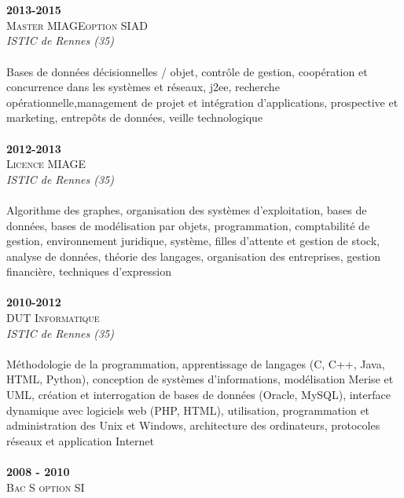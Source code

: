 \begin{titlepage}
\begin{minipage}[t]{8.7cm}
    \\\\
    \textbf{2013-2015} \\
    \textsc{Master MIAGE\footnotemark option SIAD\footnotemark}
    \\\textit{ISTIC de Rennes (35)}
    \\\\Bases de données décisionnelles / objet, contrôle de gestion,
    coopération et concurrence dans les systèmes et réseaux,
    j2ee, recherche opérationnelle,management de
    projet et intégration d'applications, prospective et
    marketing, entrepôts de données, veille technologique
    \\\\\textbf{2012-2013}\\
    \textsc{Licence MIAGE}
    \\\textit{ISTIC de Rennes (35)}
    \\\\Algorithme des graphes, organisation des systèmes d'exploitation,
    bases de données, bases de modélisation par objets, programmation, comptabilité de gestion,
    environnement juridique, système, filles d'attente et
    gestion de stock, analyse de données, théorie des
    langages, organisation des entreprises, gestion financière,
    techniques d'expression
    \\\\\textbf{2010-2012} \\
    \textsc{DUT Informatique}
    \\\textit{ISTIC de Rennes (35)}
    \\\\Méthodologie de la programmation, apprentissage de
    langages (C, C++, Java, HTML, Python), conception de
    systèmes d'informations, modélisation Merise et UML,
    création et interrogation de bases de données (Oracle,
    MySQL), interface dynamique avec logiciels web (PHP,
    HTML), utilisation, programmation et administration des
    Unix et Windows, architecture des ordinateurs,
    protocoles réseaux et application Internet
    \\\\\textbf{2008 - 2010} \\
    \textsc{Bac S option SI\footnotemark}
  \end{minipage}
  \hfill
  \begin{minipage}[t]{8.7cm}

    \\\\


\end{minipage}
\end{titlepage}
